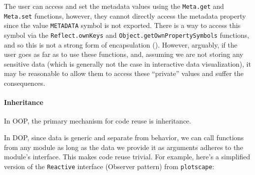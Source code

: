 \documentclass[
]{book}
\theoremstyle{definition}
\theoremstyle{definition}
\theoremstyle{definition}
\theoremstyle{definition}
\theoremstyle{remark}
\begin{document}
The user can access and set the metadata values using the \texttt{Meta.get} and \texttt{Meta.set} functions, however, they cannot directly access the metadata property since the value \texttt{METADATA} symbol is not exported. There is a way to access this symbol via the \texttt{Reflect.ownKeys} and \texttt{Object.getOwnPropertySymbols} functions, and so this is not a strong form of encapsulation (). However, arguably, if the user goes as far as to use these functions, and, assuming we are not storing any sensitive data (which is generally not the case in interactive data visualization), it may be reasonable to allow them to access these ``private'' values and suffer the consequences.

\paragraph{Inheritance}\label{inheritance}

In OOP, the primary mechanism for code reuse is inheritance.

In DOP, since data is generic and separate from behavior, we can call functions from any module as long as the data we provide it as arguments adheres to the module's interface. This makes code reuse trivial. For example, here's a simplified version of the \texttt{Reactive} interface (Observer pattern) from \texttt{plotscape}:
\end{document}
